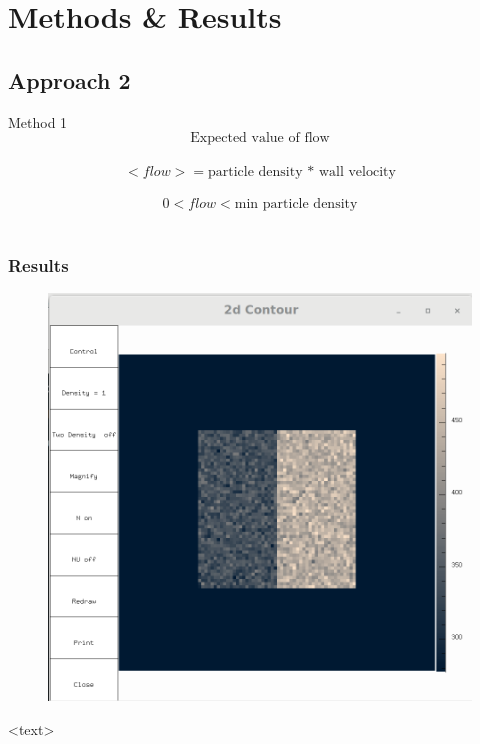 \documentclass{beamer}
\begin{document}
\section{Methods & Results}

\subsection{Approach 2}
\begin{frame}{Method 1}
$$
\textrm{Expected value of flow}$$\\
$$<flow> = \textrm{particle density * wall velocity}$$\\
$$0 < flow < \textrm{min particle density}$$\\
\end{frame}

\begin{frame}
\frametitle{Results}
\begin{figure}
\includegraphics[scale=0.2]{A1p1}
\caption{}
\end{figure}
<text>
\end{frame}
\end{document}

